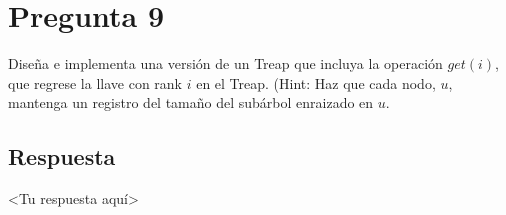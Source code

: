 \section*{Pregunta 9}


\noindent Diseña e implementa una versión de un Treap que incluya la operación $get(i)$, que regrese la llave con rank $i$ en el Treap. (Hint: Haz que cada nodo, $u$, mantenga un registro del tamaño del subárbol enraizado en $u$.


\subsection*{Respuesta}

<Tu respuesta aquí>

\bigskip

